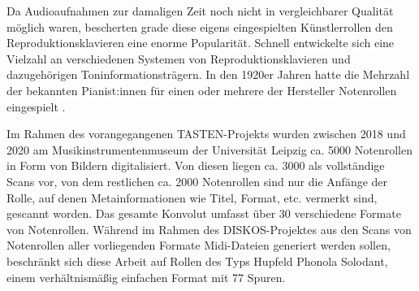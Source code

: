 Da Audioaufnahmen zur damaligen Zeit noch nicht in vergleichbarer Qualität möglich waren, bescherten grade diese eigens eingespielten Künstlerrollen den Reproduktionsklavieren eine enorme Popularität.
Schnell entwickelte sich eine Vielzahl an verschiedenen Systemen von Reproduktionsklavieren und dazugehörigen Toninformationsträgern.
In den 1920er Jahren hatte die Mehrzahl der bekannten Pianist:innen für einen oder mehrere der Hersteller Notenrollen eingespielt \parencite[]{bowers_1972}.

Im Rahmen des vorangegangenen TASTEN-Projekts wurden zwischen 2018 und 2020 am Musikinstrumentenmuseum der Universität Leipzig ca. 5000 Notenrollen in Form von Bildern digitalisiert.
Von diesen liegen ca. 3000 als vollständige Scans vor, von dem restlichen ca. 2000 Notenrollen sind nur die Anfänge der Rolle, auf denen Metainformationen wie Titel, Format, etc. vermerkt sind, gescannt worden.
Das gesamte Konvolut umfasst über 30 verschiedene Formate von Notenrollen.
Während im Rahmen des DISKOS-Projektes aus den Scans von Notenrollen aller vorliegenden Formate Midi-Dateien generiert werden sollen, beschränkt sich diese Arbeit auf Rollen des Typs Hupfeld Phonola Solodant, einem verhältnismäßig einfachen Format mit 77 Spuren.

\pagebreak